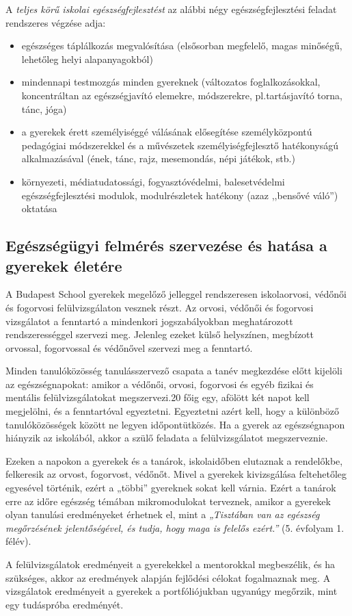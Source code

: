 A \emph{teljes körű iskolai egészségfejlesztést} az alábbi négy
egészségfejlesztési feladat rendszeres végzése adja:

\begin{itemize}
\item
  egészséges táplálkozás megvalósítása (elsősorban megfelelő, magas
  minőségű, lehetőleg helyi alapanyagokból)
\item
  mindennapi testmozgás minden gyereknek (változatos foglalkozásokkal,
  koncentráltan az egészségjavító elemekre, módszerekre, pl.tartásjavító
  torna, tánc, jóga)
\item
  a gyerekek érett személyiséggé válásának elősegítése személyközpontú
  pedagógiai módszerekkel és a művészetek személyiségfejlesztő
  hatékonyságú alkalmazásával (ének, tánc, rajz, mesemondás, népi
  játékok, stb.)
\item
  környezeti, médiatudatossági, fogyasztóvédelmi, balesetvédelmi
  egészségfejlesztési modulok, modulrészletek hatékony (azaz
  ,,bensővé váló'') oktatása
\end{itemize}

\hypertarget{egeszsegugyi-felmeres-szervezese-es-hatasa-a-gyerekek-eletere}{%
\subsection{Egészségügyi felmérés szervezése és hatása a gyerekek
életére}\label{egeszsegugyi-felmeres-szervezese-es-hatasa-a-gyerekek-eletere}}

A Budapest School gyerekek megelőző jelleggel rendszeresen iskolaorvosi,
védőnői és fogorvosi felülvizsgálaton vesznek részt. Az orvosi, védőnői
és fogorvosi vizsgálatot a fenntartó a mindenkori jogszabályokban
meghatározott rendszerességgel szervezi meg. Jelenleg ezeket külső
helyszínen, megbízott orvossal, fogorvossal és védőnővel szervezi meg a
fenntartó.

Minden tanulóközösség tanulásszervező csapata a tanév megkezdése előtt
kijelöli az egészségnapokat: amikor a védőnői, orvosi, fogorvosi és
egyéb fizikai és mentális felülvizsgálatokat megszervezi.20 főig egy,
afölött két napot kell megjelölni, és a fenntartóval egyeztetni.
Egyeztetni azért kell, hogy a különböző tanulóközösségek között ne
legyen időpontütközés. Ha a gyerek az egészségnapon hiányzik az
iskolából, akkor a szülő feladata a felülvizsgálatot megszerveznie.

Ezeken a napokon a gyerekek és a tanárok, iskolaidőben elutaznak a
rendelőkbe, felkeresik az orvost, fogorvost, védőnőt. Mivel a gyerekek
kivizsgálása feltehetőleg egyesével történik, ezért a „többi'' gyereknek
sokat kell várnia. Ezért a tanárok erre az időre egészség témában
mikromodulokat terveznek, amikor a gyerekek olyan tanulási eredményeket
érhetnek el, mint a \emph{„Tisztában van az egészség megőrzésének
jelentőségével, és tudja, hogy maga is felelős ezért.''} (5. évfolyam 1.
félév).

A felülvizsgálatok eredményeit a gyerekekkel a mentorokkal megbeszélik,
és ha szükséges, akkor az eredmények alapján fejlődési célokat
fogalmaznak meg. A vizsgálatok eredményeit a gyerekek a portfóliójukban
ugyanúgy megőrzik, mint egy tudáspróba eredményét.
